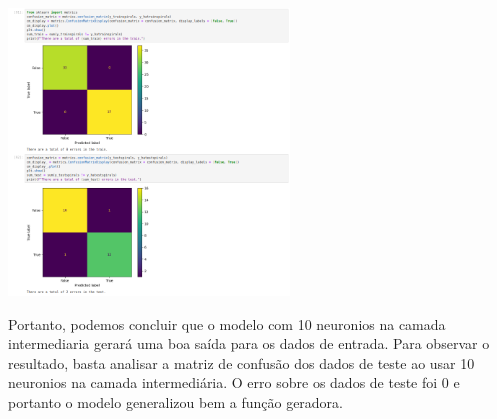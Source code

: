 \documentclass{article}
\begin{document}
\begin{center}

\includegraphics[height=3in]{exercise_pic/spirals/conf_matrix_spirals_30.png}
\vspace{10pt} 

Portanto, podemos concluir que o modelo com 10 neuronios na camada intermediaria gerará uma boa saída para os dados de entrada. Para observar o resultado, basta analisar a matriz de confusão dos dados de teste ao usar 10 neuronios na camada intermediária. O erro sobre os dados de teste foi 0 e portanto o modelo generalizou bem a função geradora.

\end{center}
\end{document}
